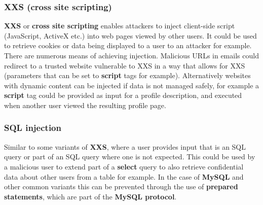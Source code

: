 \documentclass{article}
\newcommand{\np}{\vspace{8pt} \\}
\begin{document}
\subsubsection{XXS (cross site scripting)}
\textbf{XXS} or \textbf{cross site scripting} enables attackers to inject client-side script (JavaScript, ActiveX etc.) into web pages viewed by other users. It could be used to retrieve cookies or data being displayed to a user to an attacker for example. \np
There are numerous means of achieving injection. Malicious URLs in emails could redirect to a trusted website vulnerable to XXS in a way that allows for XXS (parameters that can be set to \textbf{script} tags for example). Alternatively websites with dynamic content can be injected if data is not managed safely, for example a \textbf{script} tag could be provided as input for a profile description, and executed when another user viewed the resulting profile page.

\subsubsection{SQL injection}
Similar to some variants of \textbf{XXS}, where a user provides input that is an SQL query or part of an SQL query where one is not expected. This could be used by a malicious user to extend part of a \textbf{select} query to also retrieve confidential data about other users from a table for example. In the case of \textbf{MySQL} and other common variants this can be prevented through the use of \textbf{prepared statements}, which are part of the \textbf{MySQL protocol}.
\end{document}
